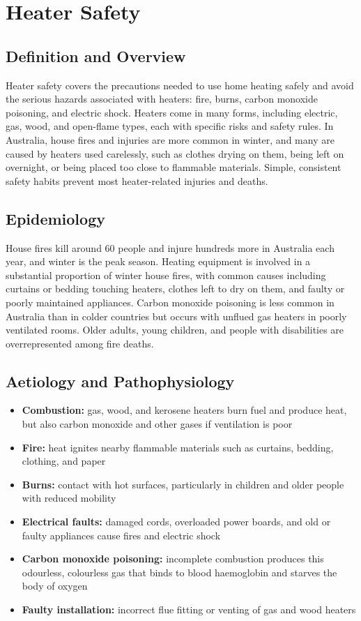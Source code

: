 \chapter{Heater Safety}

\section*{Definition and Overview}
Heater safety covers the precautions needed to use home heating safely and avoid the serious hazards associated with heaters: fire, burns, carbon monoxide poisoning, and electric shock. Heaters come in many forms, including electric, gas, wood, and open-flame types, each with specific risks and safety rules. In Australia, house fires and injuries are more common in winter, and many are caused by heaters used carelessly, such as clothes drying on them, being left on overnight, or being placed too close to flammable materials. Simple, consistent safety habits prevent most heater-related injuries and deaths.

\section*{Epidemiology}
House fires kill around 60 people and injure hundreds more in Australia each year, and winter is the peak season. Heating equipment is involved in a substantial proportion of winter house fires, with common causes including curtains or bedding touching heaters, clothes left to dry on them, and faulty or poorly maintained appliances. Carbon monoxide poisoning is less common in Australia than in colder countries but occurs with unflued gas heaters in poorly ventilated rooms. Older adults, young children, and people with disabilities are overrepresented among fire deaths.

\section*{Aetiology and Pathophysiology}
\begin{itemize}
    \item \textbf{Combustion:} gas, wood, and kerosene heaters burn fuel and produce heat, but also carbon monoxide and other gases if ventilation is poor
    \item \textbf{Fire:} heat ignites nearby flammable materials such as curtains, bedding, clothing, and paper
    \item \textbf{Burns:} contact with hot surfaces, particularly in children and older people with reduced mobility
    \item \textbf{Electrical faults:} damaged cords, overloaded power boards, and old or faulty appliances cause fires and electric shock
    \item \textbf{Carbon monoxide poisoning:} incomplete combustion produces this odourless, colourless gas that binds to blood haemoglobin and starves the body of oxygen
    \item \textbf{Faulty installation:} incorrect flue fitting or venting of gas and wood heaters
\end{itemize}

